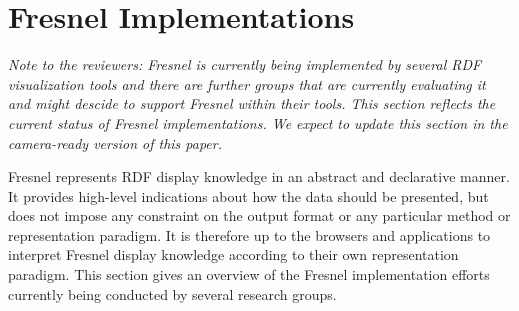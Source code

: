 \section{Fresnel Implementations}
\label{impl}

{\em Note to the reviewers: Fresnel is currently being implemented by several RDF visualization tools and there are further groups that are currently evaluating it and might descide to support Fresnel within their tools. This section reflects the current status of Fresnel implementations. We expect to update this section in the camera-ready version of this paper.}

Fresnel represents RDF display knowledge in an abstract and declarative manner. It provides high-level indications about how the data should be presented, but does not impose any constraint on the output format or any particular method or representation paradigm. It is therefore up to the browsers and applications to interpret Fresnel display knowledge according to their own representation paradigm. This section gives an overview of the Fresnel implementation efforts currently being conducted by several research groups.
